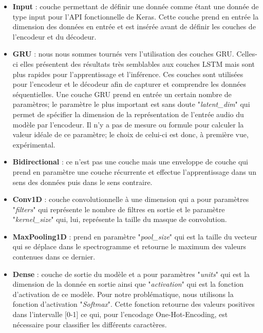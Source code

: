 \begin{itemize}
    \item \textbf{Input} : couche permettant de définir une donnée comme étant une donnée de type input pour l'API fonctionnelle de Keras. Cette couche prend en entrée la dimension des données en entrée et est insérée avant de définir les couches de l'encodeur et du décodeur.\\
    
    \item \textbf{GRU} : nous nous sommes tournés vers l'utilisation des couches GRU. Celles-ci elles présentent des résultats très semblables aux couches LSTM mais sont plus rapides pour l'apprentissage et l'inférence. Ces couches sont utilisées pour l'encodeur et le décodeur afin de capturer et comprendre les données séquentielles. Une couche GRU prend en entrée un certain nombre de paramètres; le paramètre le plus important est sans doute "\textit{latent\_dim}" qui permet de spécifier la dimension de la représentation de l'entrée audio du modèle par l'encodeur. Il n'y a pas de mesure ou formule pour calculer la valeur idéale de ce paramètre; le choix de celui-ci est donc, à première vue, expérimental.\\
    
    \item \textbf{Bidirectional} : ce n'est pas une couche mais une enveloppe de couche qui prend en paramètre une couche récurrente et effectue l'apprentissage dans un sens des données puis dans le sens contraire.\\
    
    \item \textbf{Conv1D} : couche convolutionnelle à une dimension qui a pour paramètres "\textit{filters}" qui représente le nombre de filtres en sortie et le paramètre "\textit{kernel\_size}" qui, lui, représente la taille du masque de convolution.\\
    
    \item \textbf{MaxPooling1D} : prend en paramètre "\textit{pool\_size}" qui est la taille du vecteur qui se déplace dans le spectrogramme et retourne le maximum des valeurs contenues dans ce dernier.\\
    
    \item \textbf{Dense} : couche de sortie du modèle et a pour paramètres "\textit{units}" qui est la dimension de la donnée en sortie ainsi que "\textit{activation}" qui est la fonction d'activation de ce modèle. Pour notre problématique, nous utilisons la fonction d'activation "\textit{Softmax}". Cette fonction retourne des valeurs positives dans l'intervalle [0-1] ce qui, pour l'encodage One-Hot-Encoding, est nécessaire pour classifier les différents caractères.
\end{itemize}

